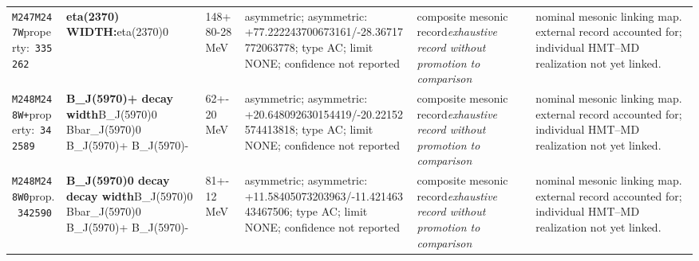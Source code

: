 \begin{landscape}
\begin{longtable}{L{1.85cm}L{4.45cm}L{2.35cm}L{4.05cm}L{3.35cm}L{7.15cm}}
\texttt{M247}\newline \texttt{M247W}\newline property:\ \texttt{335262} & \textbf{eta(2370) WIDTH:}\newline eta(2370)0 & 148+80-28\,MeV & asymmetric; asymmetric: +77.222243700673161/-28.36717772063778; type AC; limit NONE; confidence not reported & composite mesonic record\newline \emph{exhaustive record without promotion to comparison} & nominal mesonic linking map. external record accounted for; individual HMT--MD realization not yet linked. \\
\texttt{M248}\newline \texttt{M248W+}\newline property:\ \texttt{342589} & \textbf{B\_\allowbreak{}J(5970)+ decay width}\newline B\_\allowbreak{}J(5970)0 \textbar{}\allowbreak{} Bbar\_\allowbreak{}J(5970)0 \textbar{}\allowbreak{} B\_\allowbreak{}J(5970)+ \textbar{}\allowbreak{} B\_\allowbreak{}J(5970)- & 62+-20\,MeV & asymmetric; asymmetric: +20.648092630154419/-20.22152574413818; type AC; limit NONE; confidence not reported & composite mesonic record\newline \emph{exhaustive record without promotion to comparison} & nominal mesonic linking map. external record accounted for; individual HMT--MD realization not yet linked. \\
\texttt{M248}\newline \texttt{M248W0}\newline prop.\ \texttt{342590} & \textbf{B\_\allowbreak{}J(5970)0 decay decay width}\newline B\_\allowbreak{}J(5970)0 \textbar{}\allowbreak{} Bbar\_\allowbreak{}J(5970)0 \textbar{}\allowbreak{} B\_\allowbreak{}J(5970)+ \textbar{}\allowbreak{} B\_\allowbreak{}J(5970)- & 81+-12\,MeV & asymmetric; asymmetric: +11.58405073203963/-11.42146343467506; type AC; limit NONE; confidence not reported & composite mesonic record\newline \emph{exhaustive record without promotion to comparison} & nominal mesonic linking map. external record accounted for; individual HMT--MD realization not yet linked. \\

\end{longtable}
\end{landscape}

